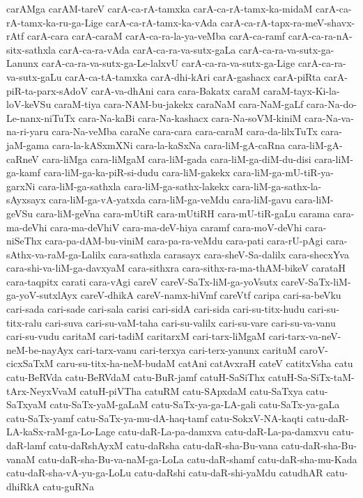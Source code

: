 {carAMga
carAM-tareV
carA-ca-rA-tamxka
carA-ca-rA-tamx-ka-midaM
carA-ca-rA-tamx-ka-ru-ga-Lige
carA-ca-rA-tamx-ka-vAda
carA-ca-rA-tapx-ra-meV-shavx-rAtf
carA-cara
carA-caraM
carA-ca-ra-la-ya-veMba
carA-ca-ramf
carA-ca-ra-nA-sitx-sathxla
carA-ca-ra-vAda
carA-ca-ra-va-sutx-gaLa
carA-ca-ra-va-sutx-ga-Lanunx
carA-ca-ra-va-sutx-ga-Le-lalxvU
carA-ca-ra-va-sutx-ga-Lige
carA-ca-ra-va-sutx-gaLu
carA-ca-tA-tamxka
carA-dhi-kAri
carA-gashacx
carA-piRta
carA-piR-ta-parx-sAdoV
carA-va-dhAni
cara
cara-Bakatx
caraM
caraM-tayx-Ki-la-loV-keVSu
caraM-tiya
cara-NAM-bu-jakekx
caraNaM
cara-NaM-gaLf
cara-Na-do-Le-nanx-niTuTx
cara-Na-kaBi
cara-Na-kashacx
cara-Na-soVM-kiniM
cara-Na-va-na-ri-yaru
cara-Na-veMba
caraNe
cara-cara
cara-caraM
cara-da-lilxTuTx
cara-jaM-gama
cara-la-kASxmXNi
cara-la-kaSxNa
cara-liM-gA-caRna
cara-liM-gA-caRneV
cara-liMga
cara-liMgaM
cara-liM-gada
cara-liM-ga-diM-du-disi
cara-liM-ga-kamf
cara-liM-ga-ka-piR-si-dudu
cara-liM-gakekx
cara-liM-ga-mU-tiR-ya-garxNi
cara-liM-ga-sathxla
cara-liM-ga-sathx-lakekx
cara-liM-ga-sathx-la-sAyxsayx
cara-liM-ga-vA-yatxda
cara-liM-ga-veMdu
cara-liM-gavu
cara-liM-geVSu
cara-liM-geVna
cara-mUtiR
cara-mUtiRH
cara-mU-tiR-gaLu
carama
cara-ma-deVhi
cara-ma-deVhiV
cara-ma-deV-hiya
caramf
cara-moV-deVhi
cara-niSeThx
cara-pa-dAM-bu-viniM
cara-pa-ra-veMdu
cara-pati
cara-rU-pAgi
cara-sAthx-va-raM-ga-Lalilx
cara-sathxla
carasayx
cara-sheV-Sa-dalilx
cara-shecxYva
cara-shi-va-liM-ga-davxyaM
cara-sithxra
cara-sithx-ra-ma-thAM-bikeV
carataH
cara-taqpitx
carati
cara-vAgi
careV
careV-SaTx-liM-ga-yoVsutx
careV-SaTx-liM-ga-yoV-sutxlAyx
careV-dhikA
careV-namx-hiVmf
careVtf
caripa
cari-sa-beVku
cari-sada
cari-sade
cari-sala
carisi
cari-sidA
cari-sida
cari-su-titx-hudu
cari-su-titx-ralu
cari-suva
cari-su-vaM-taha
cari-su-valilx
cari-su-vare
cari-su-va-vanu
cari-su-vudu
caritaM
cari-tadiM
caritarxM
cari-tarx-liMgaM
cari-tarx-va-neV-neM-be-nayAyx
cari-tarx-vanu
cari-terxya
cari-terx-yanunx
carituM
caroV-cicxSaTxM
caru-su-titx-ha-neM-budaM
catAni
catAvxraH
cateV
catitxVsha
catu
catu-BeRVda
catu-BeRVdaM
catu-BuR-jamf
catuH-SaSiThx
catuH-Sa-SiTx-taM-tArx-NeyxVvaM
catuH-piVTha
catuRM
catu-SApxdaM
catu-SaTxya
catu-SaTxyaM
catu-SaTx-yaM-gaLaM
catu-SaTx-ya-ga-LA-gali
catu-SaTx-ya-gaLa
catu-SaTx-yamf
catu-SaTx-ya-mu-dA-haq-tamf
catu-SokxV-NA-kaqti
catu-daR-LA-kaSx-raM-ga-Lo-Lage
catu-daR-La-pa-damxva
catu-daR-La-pa-damxvu
catu-daR-lamf
catu-daRshAyxM
catu-daRsha
catu-daR-sha-Bu-vana
catu-daR-sha-Bu-vanaM
catu-daR-sha-Bu-va-naM-ga-LoLa
catu-daR-shamf
catu-daR-sha-mu-Kada
catu-daR-sha-vA-yu-ga-LoLu
catu-daRshi
catu-daR-shi-yaMdu
catudhAR
catu-dhiRkA
catu-guRNa
}
